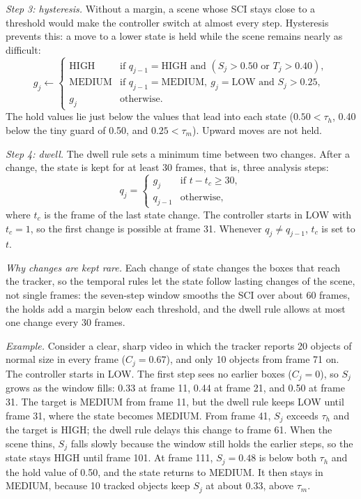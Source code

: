 \emph{Step 3: hysteresis.} Without a margin, a scene whose SCI stays close to a threshold would make the controller switch at almost every step. Hysteresis prevents this: a move to a lower state is held while the scene remains nearly as difficult:
\begin{equation}
g_j\leftarrow\begin{cases}
\text{HIGH}   & \text{if } q_{j-1}=\text{HIGH} \text{ and } (S_j>0.50 \text{ or } T_j>0.40),\\
\text{MEDIUM} & \text{if } q_{j-1}=\text{MEDIUM},\ g_j=\text{LOW} \text{ and } S_j>0.25,\\
g_j           & \text{otherwise.}
\end{cases}
\label{eq:ac-hold}
\end{equation}
The hold values lie just below the values that lead into each state ($0.50<\tau_h$, 0.40 below the tiny guard of 0.50, and $0.25<\tau_m$). Upward moves are not held.

\emph{Step 4: dwell.} The dwell rule sets a minimum time between two changes. After a change, the state is kept for at least 30 frames, that is, three analysis steps:
\begin{equation}
q_j=\begin{cases}
g_j     & \text{if } t-t_c\ge30,\\
q_{j-1} & \text{otherwise,}
\end{cases}
\label{eq:ac-dwell}
\end{equation}
where $t_c$ is the frame of the last state change. The controller starts in LOW with $t_c=1$, so the first change is possible at frame 31. Whenever $q_j\ne q_{j-1}$, $t_c$ is set to $t$.

\emph{Why changes are kept rare.} Each change of state changes the boxes that reach the tracker, so the temporal rules let the state follow lasting changes of the scene, not single frames: the seven-step window smooths the SCI over about 60 frames, the holds add a margin below each threshold, and the dwell rule allows at most one change every 30 frames.

\emph{Example.} Consider a clear, sharp video in which the tracker reports 20 objects of normal size in every frame ($C_j=0.67$), and only 10 objects from frame 71 on. The controller starts in LOW. The first step sees no earlier boxes ($C_j=0$), so $S_j$ grows as the window fills: 0.33 at frame 11, 0.44 at frame 21, and 0.50 at frame 31. The target is MEDIUM from frame 11, but the dwell rule keeps LOW until frame 31, where the state becomes MEDIUM. From frame 41, $S_j$ exceeds $\tau_h$ and the target is HIGH; the dwell rule delays this change to frame 61. When the scene thins, $S_j$ falls slowly because the window still holds the earlier steps, so the state stays HIGH until frame 101. At frame 111, $S_j=0.48$ is below both $\tau_h$ and the hold value of 0.50, and the state returns to MEDIUM. It then stays in MEDIUM, because 10 tracked objects keep $S_j$ at about 0.33, above $\tau_m$.

